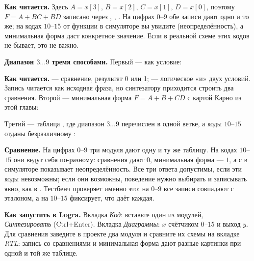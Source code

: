 
\textbf{Как читается.} Здесь $A=x[3]$, $B=x[2]$, $C=x[1]$, $D=x[0]$, поэтому
$F=A+BC+BD$ записано через , ,
. На цифрах $0$--$9$ обе записи дают одно и то же; на
кодах $10$--$15$ от функции  в симуляторе вы увидите 
(неопределённость), а минимальная форма даст конкретное значение. Если
в реальной схеме этих кодов не бывает, это не важно.

\textbf{Диапазон $3\ldots9$ тремя способами.} Первый --- как условие:


\textbf{Как читается.}  --- сравнение, результат 0 или 1;
\code{\&\&} --- логическое «и» двух условий. Запись читается как исходная
фраза, но синтезатору приходится строить два сравнения. Второй --- минимальная
форма $F=A+B+CD$ с картой Карно из этой главы:


Третий --- таблица , где диапазон $3\ldots9$ перечислен в одной
ветке, а коды $10$--$15$ отданы безразличному :


\textbf{Сравнение.} На цифрах $0$--$9$ три модуля дают одну и ту же
таблицу. На кодах $10$--$15$ они ведут себя по-разному: сравнения дают
$0$, минимальная форма --- $1$, а  с  в симуляторе
показывает неопределённость. Все три ответа допустимы, если эти коды
невозможны; если они возможны, поведение нужно выбирать и записывать
явно, как в . Тестбенч  проверяет
именно это: на $0$--$9$ все записи совпадают с эталоном, а на $10$--$15$
фиксирует, что даёт каждая.


\textbf{Как запустить в Logra.} Вкладка \emph{Код}: вставьте один из
модулей, \emph{Синтезировать} (Ctrl+Enter). Вкладка \emph{Диаграммы}: $x$
счётчиком $0$--$15$ и выход $y$. Для сравнения заведите в проекте два
модуля и сравните их схемы на вкладке \emph{RTL}: запись со сравнениями и
минимальная форма дают разные картинки при одной и той же таблице.

